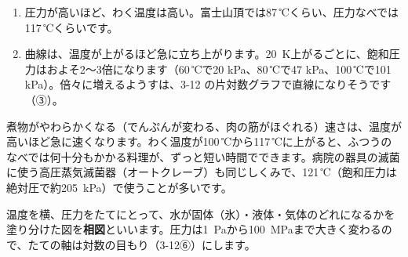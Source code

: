 \begin{enumerate}[label={\bkcircled{\arabic*}}, leftmargin=2.4\zw, itemsep=1pt, topsep=2pt]
\item 圧力が高いほど、わく温度は高い。富士山頂では87\,℃くらい、圧力なべでは117\,℃くらいです。
\item 曲線は、温度が上がるほど急に立ち上がります。\qty{20}{K}上がるごとに、飽和圧力はおよそ2〜3倍になります（60\,℃で20 kPa、80\,℃で47 kPa、100\,℃で101 kPa）。倍々に増えるようすは、3-12 の片対数グラフで直線になりそうです（③）。
\end{enumerate}

\begin{phmijika}[圧力なべで料理が早くできるわけ]
煮物がやわらかくなる（でんぷんが変わる、肉の筋がほぐれる）速さは、温度が高いほど急に速くなります。わく温度が100\,℃から117\,℃に上がると、ふつうのなべでは何十分もかかる料理が、ずっと短い時間でできます。病院の器具の滅菌に使う高圧蒸気滅菌器（オートクレーブ）も同じしくみで、121\,℃（飽和圧力は絶対圧で約\qty{205}{kPa}）で使うことが多いです。
\end{phmijika}

\label{ph:熱-10:sec2}
温度を横、圧力をたてにとって、水が固体（氷）・液体・気体のどれになるかを塗り分けた図を\textbf{相図}といいます。圧力は\qty{1}{Pa}から\qty{100}{MPa}まで大きく変わるので、たての軸は対数の目もり（3-12⑥）にします。

